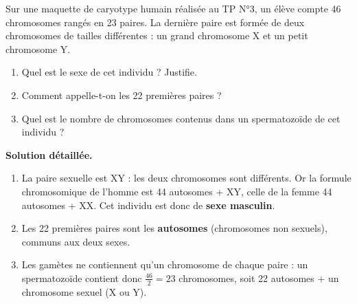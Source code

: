 \documentclass[11pt]{article}
\begin{document}
\begin{exoresolu}
Sur une maquette de caryotype humain réalisée au TP N°3, un élève compte 46 chromosomes rangés en 23 paires. La dernière paire est formée de deux chromosomes de tailles différentes : un grand chromosome X et un petit chromosome Y.
\begin{enumerate}
\item Quel est le sexe de cet individu ? Justifie.
\item Comment appelle-t-on les 22 premières paires ?
\item Quel est le nombre de chromosomes contenus dans un spermatozoïde de cet individu ?
\end{enumerate}
\tcblower
\textbf{Solution détaillée.}
\begin{enumerate}
\item La paire sexuelle est XY : les deux chromosomes sont différents. Or la formule chromosomique de l'homme est 44 autosomes + XY, celle de la femme 44 autosomes + XX. Cet individu est donc de \textbf{sexe masculin}.
\item Les 22 premières paires sont les \textbf{autosomes} (chromosomes non sexuels), communs aux deux sexes.
\item Les gamètes ne contiennent qu'un chromosome de chaque paire : un spermatozoïde contient donc $\frac{46}{2} = 23$ chromosomes, soit 22 autosomes + un chromosome sexuel (X ou Y).
\end{enumerate}
\end{exoresolu}
\end{document}
